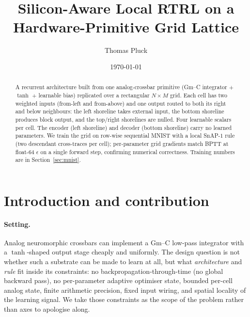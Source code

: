 \documentclass[11pt]{article}
\title{Silicon-Aware Local RTRL on a Hardware-Primitive Grid Lattice}
\author{Thomas Pluck}
\date{\today}
\begin{document}
\maketitle

\begin{abstract}
A recurrent architecture built from one analog-crossbar primitive
(Gm--C integrator $+$ $\tanh$ $+$ learnable bias) replicated over a
rectangular $N{\times}M$ grid. Each cell has two weighted inputs
(from-left and from-above) and one output routed to both its right
and below neighbours: the left shoreline takes external input, the
bottom shoreline produces block output, and the top/right shorelines
are nulled. Four learnable scalars per cell. The encoder (left
shoreline) and decoder (bottom shoreline) carry no learned parameters.
We train the grid on row-wise sequential MNIST with a local SnAP-$1$
rule (two descendant cross-traces per cell); per-parameter grid
gradients match BPTT at float-$64$ $\epsilon$ on a single forward step,
confirming numerical correctness. Training numbers are in
Section~\ref{sec:mnist}.
\end{abstract}

\section{Introduction and contribution}

\paragraph{Setting.}
Analog neuromorphic crossbars can implement a Gm--C low-pass integrator
with a $\tanh$-shaped output stage cheaply and uniformly. The design
question is not whether such a substrate can be made to learn at all,
but what \emph{architecture} and \emph{rule} fit inside its constraints:
no backpropagation-through-time (no global backward pass), no
per-parameter adaptive optimiser state, bounded per-cell analog state,
finite arithmetic precision, fixed input wiring, and spatial locality of
the learning signal. We take those constraints as the scope of the
problem rather than axes to apologise along.
\end{document}
